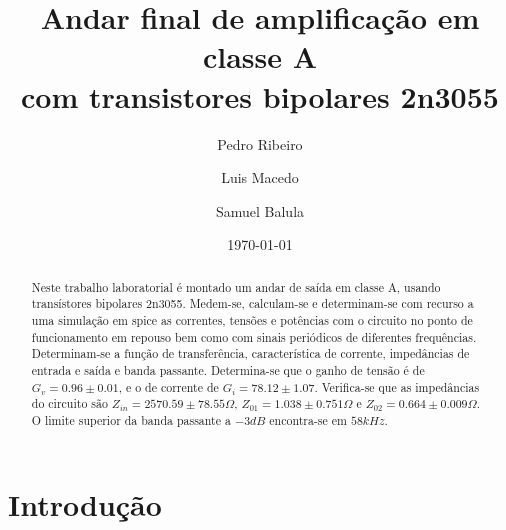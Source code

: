 \documentclass[%
  reprint,
  nofootinbib,
  amsmath,amssymb,
  aps,
  10pt,
  a4paper
]{revtex4-1}
\begin{document}

 

\title{Andar final de amplificação em classe A\\
com transistores bipolares 2n3055}

\author{Pedro Ribeiro}%
\author{Luis Macedo}%
\author{Samuel Balula}%



\date{\today}
\begin{abstract}
Neste trabalho laboratorial é montado um andar de saída em classe A, usando transístores bipolares 2n3055.
Medem-se, calculam-se e determinam-se com recurso a uma simulação em spice as correntes, tensões e potências com o circuito no ponto de funcionamento em repouso bem como com sinais periódicos de diferentes frequências.
Determinam-se a função de transferência, característica de corrente, impedâncias de entrada e saída e banda passante.
Determina-se que o ganho de tensão é de $G_v=0.96\pm0.01$, e o de corrente de $G_i=78.12\pm1.07$.
Verifica-se que as impedâncias do circuito são $Z_{in}=2570.59\pm78.55 \Omega$, $Z_{01}=1.038\pm0.751 \Omega$ e $Z_{02}=0.664\pm0.009 \Omega$. O limite superior da banda passante a $-3dB$ encontra-se em $58kHz$.

\end{abstract}
\maketitle

\section{Introdução}
\label{s:intro}
\end{document}
